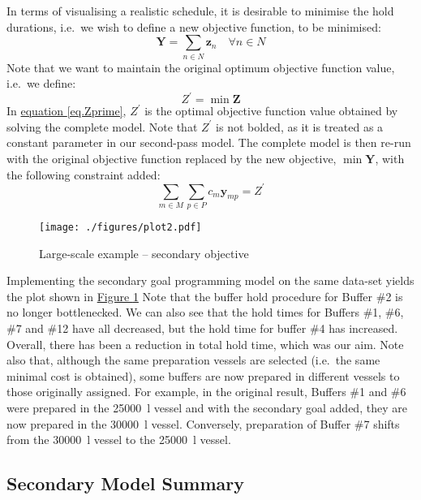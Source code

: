 In terms of visualising a realistic schedule, it is desirable to minimise the
hold durations, i.e.\ we wish to define a new objective function, to be
minimised:
\begin{equation}
    \boldsymbol{Y} = \sum_{n \in N} \boldsymbol{z}_{n} \quad \forall n \in N
    \label{eq.objfn2}
\end{equation}
Note that we want to maintain the original optimum objective function value,
i.e.\ we define:
\begin{equation}
    Z^{\prime} = \min \boldsymbol{Z}
    \label{eq.Zprime}
\end{equation}
In \hyperref[eq.Zprime]{equation \ref*{eq.Zprime}}, $Z^{\prime}$ is the optimal objective function value
obtained by solving the complete model.
Note that $Z^{\prime}$ is not bolded, as it is treated as a constant parameter
in our second-pass model.
The complete model is then re-run with the original objective function replaced
by the new objective, $\min \boldsymbol{Y}$, with the following constraint
added:
\begin{equation}
    \sum_{m \in M} \sum_{p \in P} c_m \boldsymbol{y}_{mp} = Z^{\prime}
    \label{eq.constr10}
\end{equation}
\begin{figure}
    \centering
    \texttt{[image: ./figures/plot2.pdf]}
    \caption{Large-scale example -- secondary objective}
    \label{fig.secondary}
\end{figure}

Implementing the secondary goal programming model on the same data-set yields
the plot shown in \hyperref[fig.secondary]{Figure \ref*{fig.secondary}}
Note that the buffer hold procedure for Buffer \#2 is no longer bottlenecked.
We can also see that the hold times for Buffers \#1, \#6, \#7 and \#12 have
all decreased, but the hold time for buffer \#4 has increased.
Overall, there has been a reduction in total hold time, which was our aim.
Note also that, although the same preparation vessels are selected (i.e.\ the
same minimal cost is obtained), some buffers are now prepared in different
vessels to those originally assigned.
For example, in the original result, Buffers \#1 and \#6 were prepared in the
\SI{25000}{\litre} vessel and with the secondary goal added, they are now
prepared in the \SI{30000}{\litre} vessel.
Conversely, preparation of Buffer \#7 shifts from the \SI{30000}{\litre} vessel
to the \SI{25000}{\litre} vessel.

\subsection{Secondary Model Summary}\label{SS.model2summary}

